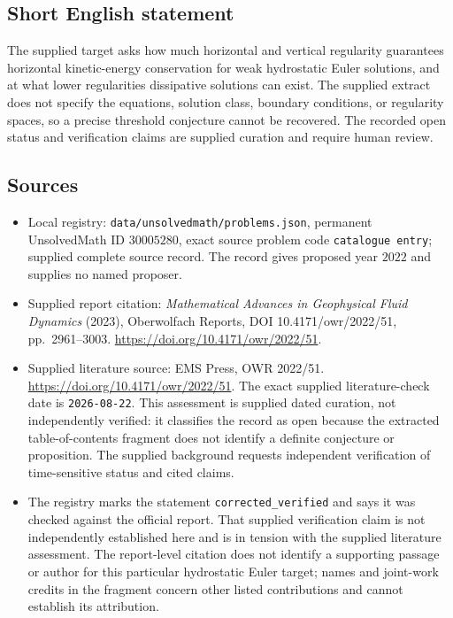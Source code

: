 \documentclass[11pt]{article}
\begin{document}
\subsection{Short English statement}
The supplied target asks how much horizontal and vertical regularity guarantees horizontal kinetic-energy conservation for weak hydrostatic Euler solutions, and at what lower regularities dissipative solutions can exist. The supplied extract does not specify the equations, solution class, boundary conditions, or regularity spaces, so a precise threshold conjecture cannot be recovered. The recorded open status and verification claims are supplied curation and require human review.
\subsection{Sources}
\begin{itemize}
\item Local registry: \texttt{data/unsolvedmath/problems.json}, permanent UnsolvedMath ID \(30005280\), exact source problem code \texttt{catalogue entry}; supplied complete source record. The record gives proposed year \(2022\) and supplies no named proposer.
\item Supplied report citation: \emph{Mathematical Advances in Geophysical Fluid Dynamics} (2023), Oberwolfach Reports, DOI 10.4171/owr/2022/51, pp.\ 2961--3003. \url{https://doi.org/10.4171/owr/2022/51}.
\item Supplied literature source: EMS Press, OWR 2022/51. \url{https://doi.org/10.4171/owr/2022/51}. The exact supplied literature-check date is \texttt{2026-08-22}. This assessment is supplied dated curation, not independently verified: it classifies the record as open because the extracted table-of-contents fragment does not identify a definite conjecture or proposition. The supplied background requests independent verification of time-sensitive status and cited claims.
\item The registry marks the statement \texttt{corrected\_verified} and says it was checked against the official report. That supplied verification claim is not independently established here and is in tension with the supplied literature assessment. The report-level citation does not identify a supporting passage or author for this particular hydrostatic Euler target; names and joint-work credits in the fragment concern other listed contributions and cannot establish its attribution.
\end{itemize}
\end{document}
